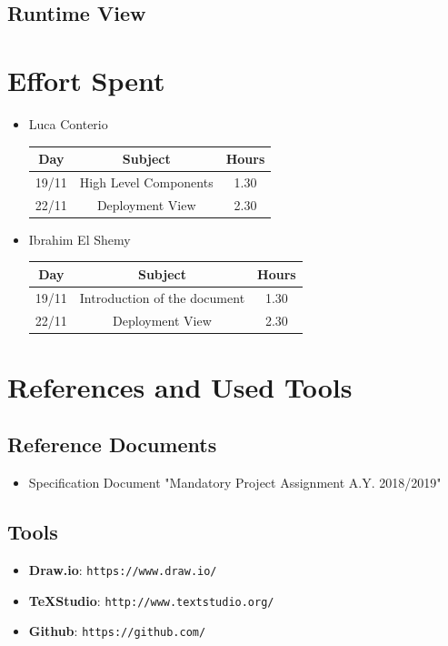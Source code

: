 \documentclass[12pt,a4paper]{article}
\begin{document}
	\subsection{Runtime View}
		



	\newpage
	\section{Effort Spent}
	\begin{itemize}
		\item Luca Conterio
		\begin{center}
			\begin{tabular}{| c | c | c |}
				\hline
				Day & Subject & Hours \\ \hline
				19/11 & High Level Components & 1.30 \\ \hline
				22/11 & Deployment View & 2.30 \\ \hline
			\end{tabular}
		\end{center}

		\item Ibrahim El Shemy
		\begin{center}
			\begin{tabular}{| c | c | c |}
				\hline
				Day & Subject & Hours \\ \hline
				19/11 & Introduction of the document & 1.30 \\ \hline
				22/11 & Deployment View & 2.30 \\ \hline
			\end{tabular}
		\end{center}
	\end{itemize}
	\section{References and Used Tools}
		\subsection{Reference Documents}
			\begin{itemize}
				\item Specification Document "Mandatory Project Assignment A.Y. 2018/2019"
			\end{itemize}
		\subsection{Tools}
			\begin{itemize}
				\item \textbf{Draw.io}: \texttt{https://www.draw.io/}
				\item \textbf{TeXStudio}: \texttt{http://www.textstudio.org/}
				\item \textbf{Github}: \texttt{https://github.com/}
			\end{itemize}
		
\end{document}
